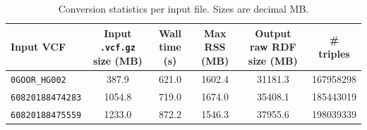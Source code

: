 \begin{table}[t]
\centering
\small
\setlength{\tabcolsep}{4pt}
\begin{tabular}{@{}p{}
S[table-format=6.1]
S[table-format=6.1]
S[table-format=7.1]
S[table-format=7.1]
S[table-format=10.0]@{}}
\toprule
\textbf{Input VCF} &
{\textbf{Input \texttt{.vcf.gz} size (MB)}} &
{\textbf{Wall time (s)}} &
{\textbf{Max RSS (MB)}} &
{\textbf{Output raw RDF size (MB)}} &
{\textbf{\# triples}} \\
\midrule
\texttt{0GOOR\_HG002} & 387.9 & 621.0 & 1602.4 & 31181.3 & 167958298 \\
\texttt{60820188474283} & 1054.8 & 719.0 & 1674.0 & 35408.1 & 185443019 \\
\texttt{60820188475559} & 1233.0 & 872.2 & 1546.3 & 37955.6 & 198039339 \\
\bottomrule
\end{tabular}
\caption{Conversion statistics per input file. Sizes are decimal MB.}
\label{tab:conversion-stats}
\end{table}
